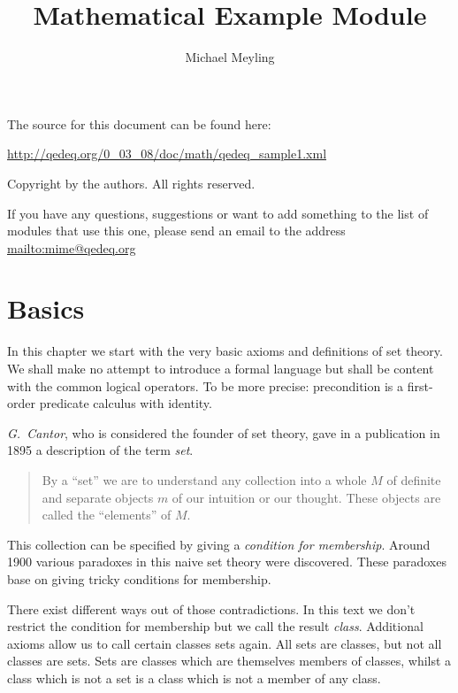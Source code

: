 \documentclass[a4paper,german,10pt,twoside]{book}
\title{Mathematical Example Module}
\author{
Michael Meyling
}
\theoremstyle{definition}
\theoremstyle{remark}
\begin{document}
\maketitle

\setlength{\parskip}{5pt plus 2pt minus 1pt}
\mbox{}
\vfill

\par
The source for this document can be found here:
\par
\url{http://qedeq.org/0_03_08/doc/math/qedeq_sample1.xml}

\par
Copyright by the authors. All rights reserved.
\par
If you have any questions, suggestions or want to add something to the list of modules that use this one, please send an email to the address \url{mailto:mime@qedeq.org}

\setlength{\parskip}{0pt}
\tableofcontents

\setlength{\parskip}{5pt plus 2pt minus 1pt}

\chapter{Basics} \label{chapter0} \hypertarget{chapter0}{}

In this chapter we start with the very basic axioms and definitions of set theory. We shall make no attempt to introduce a formal language but shall be content with the common logical operators. To be more precise: precondition is a first-order predicate calculus with identity.

\par
\emph{G.~Cantor}, who is considered the founder of set theory, gave in a publication in 1895 a description of the term \emph{set}.

\begin{quote}
 By a ``set'' we are to understand any collection into a whole $M$ of definite and separate objects $m$ of our intuition or our thought. These objects are called the ``elements'' of $M$.
\end{quote}

\par
This collection can be specified by giving a \emph{condition for membership}. Around 1900 various paradoxes in this naive set theory were discovered. These paradoxes base on giving tricky conditions for membership.

\par
There exist different ways out of those contradictions. In this text we don't restrict the condition for membership but we call the result \emph{class}. Additional axioms allow us to call certain classes sets again. All sets are classes, but not all classes are sets. Sets are classes which are themselves members of classes, whilst a class which is not a set is a class which is not a member of any class.
\end{document}
